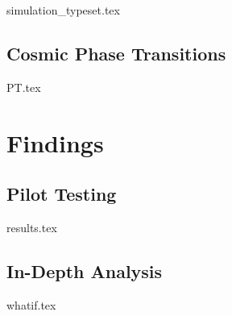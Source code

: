\documentclass[UKenglish]{texmex/uiomasterthesis}
\begin{document}
{{simulation_typeset.tex}


\chapter{Cosmic Phase Transitions}\label{chap:PT}
    {{PT.tex}}

















\part{Findings}\label{part:findings}



\chapter{Pilot Testing}\label{chap:results}
    {{results.tex}}


\chapter{In-Depth Analysis}\label{chap:whatif}
    {{whatif.tex}}





}
\end{document}
